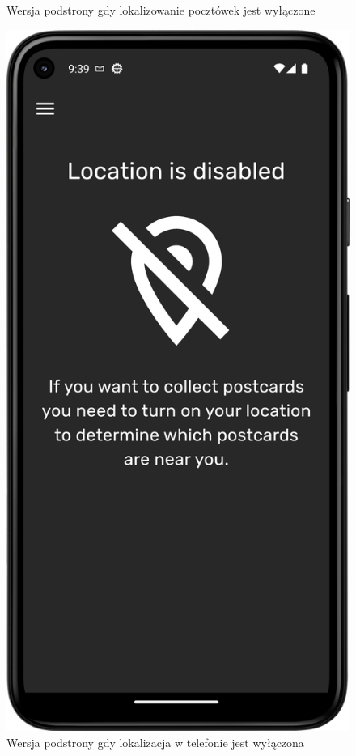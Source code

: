 \documentclass[a4paper,twoside,12pt]{book}
\begin{document}
\begin{figure}[H]
\begin{minipage}[b]{0.49\textwidth}
    \caption{Wersja podstrony gdy lokalizowanie pocztówek jest wyłączone}
  \end{minipage}
  \hfill
  \begin{minipage}[b]{0.49\textwidth}
    \includegraphics[width=\textwidth]{mobile_ss/lokalizacja_w_tel_wylaczana.png}
    \caption{Wersja podstrony gdy lokalizacja w telefonie jest wyłączona}
  \end{minipage}
\end{figure}
\end{document}

